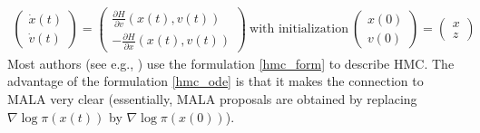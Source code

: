 \documentclass{scrartcl}
\begin{document}
\begin{align}\label{hmc_form}
    \begin{pmatrix}
    \dot{x}(t) \\ \dot{v}(t)
  \end{pmatrix} =
  \begin{pmatrix}
    \frac{\partial H}{\partial v}(x(t), v(t)) \\ -\frac{\partial
    H}{\partial x}(x(t), v(t))
  \end{pmatrix} ~\text{with initialization}~
  \begin{pmatrix}
    x(0) \\ v(0)
  \end{pmatrix} =
  \begin{pmatrix}
    x \\ z
  \end{pmatrix}
\end{align}
Most authors (see e.g., \citet{neal2011mcmc}) use the formulation
\eqref{hmc_form} to describe HMC. The advantage of the formulation
\eqref{hmc_ode} is that it makes the connection to MALA very clear
(essentially, MALA proposals are obtained by replacing $\nabla \log
\pi(x(t))$ by $\nabla \log \pi(x(0))$).
\end{document}

